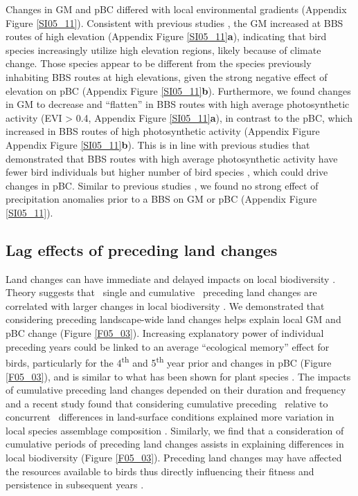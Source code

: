 Changes in GM and pBC differed with local environmental gradients (Appendix Figure \ref{SI05_11}). Consistent with previous studies \citep{Lomolino2008,Jarzyna2017}, the GM increased at BBS routes of high elevation (Appendix Figure \ref{SI05_11}\textbf{a}), indicating that bird species increasingly utilize high elevation regions, likely because of climate change. Those species appear to be different from the species previously inhabiting BBS routes at high elevations, given the strong negative effect of elevation on pBC (Appendix Figure \ref{SI05_11}\textbf{b}). Furthermore, we found changes in GM to decrease and “flatten” in BBS routes with high average photosynthetic activity (EVI > 0.4, Appendix Figure \ref{SI05_11}\textbf{a}), in contrast to the pBC, which increased in BBS routes of high photosynthetic activity (Appendix Figure Appendix Figure \ref{SI05_11}\textbf{b}). This is in line with previous studies that demonstrated that BBS routes with high average photosynthetic activity have fewer bird individuals \citep{Barnagaud2017} but higher number of bird species \citep{Rowhani2008,Goetz2014}, which could drive changes in pBC. Similar to previous studies \citep{Barnagaud2017}, we found no strong effect of precipitation anomalies prior to a BBS on GM or pBC (Appendix Figure \ref{SI05_11}). 

\subsection{Lag effects of preceding land changes}
\label{C05_0402}

Land changes can have immediate and delayed impacts on local biodiversity \citep{Kuussaari2009,Hylander2013}. Theory suggests that \textendash\ single and cumulative \textendash\ preceding land changes are correlated with larger changes in local biodiversity \citep{Scheffer2001,Andersen2009,Watson2014,Ratajczak2018}. We demonstrated that considering preceding landscape-wide land changes helps explain local GM and pBC change (Figure \ref{F05_03}). Increasing explanatory power of individual preceding years could be linked to an average “ecological memory” effect for birds, particularly for the 4\textsuperscript{th} and 5\textsuperscript{th} year prior and changes in pBC (Figure \ref{F05_03}), and is similar to what has been shown for plant species \citep{Ogle2015}. The impacts of cumulative preceding land changes depended on their duration \citep{Essl2015} and frequency \citep{Watson2014,Ratajczak2018} and a recent study found that considering cumulative preceding \textendash\ relative to concurrent \textendash\ differences in land-surface conditions explained more variation in local species assemblage composition \citep{Jung2018}. Similarly, we find that a consideration of cumulative periods of preceding land changes assists in explaining differences in local biodiversity (Figure \ref{F05_03}). Preceding land changes may have affected the resources available to birds thus directly influencing their fitness and persistence in subsequent years \citep{Holt2009,Harrison2011,Ogle2015}.

